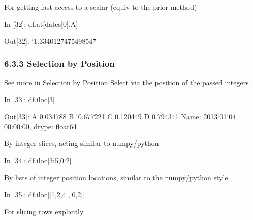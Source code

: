 \documentclass[letterpaper,10pt,english]{sphinxmanual}
\def\PYGZhy{\char`\-}
\def\PYGZsq{\char`\'}
\renewcommand\PYGZsq{\textquotesingle}
\begin{document}
For getting fast access to a scalar (equiv to the prior method)

\begin{OriginalVerbatim}[commandchars=\\\{\}]
\textcolor{nbsphinxin}{In [32]: }df.at[dates[0],\PYGZsq{}A\PYGZsq{}]
\end{OriginalVerbatim}

\begin{OriginalVerbatim}[commandchars=\\\{\}]
\textcolor{nbsphinxout}{Out[32]: }\PYGZhy{}1.3340127475498547
\end{OriginalVerbatim}


\subsubsection{6.3.3 Selection by Position}
\label{pandas_quickstart:6.3.3-Selection-by-Position}
See more in Selection by Position Select via the position of the passed
integers

\begin{OriginalVerbatim}[commandchars=\\\{\}]
\textcolor{nbsphinxin}{In [33]: }df.iloc[3]
\end{OriginalVerbatim}

\begin{OriginalVerbatim}[commandchars=\\\{\}]
\textcolor{nbsphinxout}{Out[33]: }A    0.034788
         B   \PYGZhy{}0.677221
         C    0.120449
         D    0.794341
         Name: 2013\PYGZhy{}01\PYGZhy{}04 00:00:00, dtype: float64
\end{OriginalVerbatim}

By integer slices, acting similar to numpy/python

\begin{OriginalVerbatim}[commandchars=\\\{\}]
\textcolor{nbsphinxin}{In [34]: }df.iloc[3:5,0:2]
\end{OriginalVerbatim}

By lists of integer position locations, similar to the numpy/python
style

\begin{OriginalVerbatim}[commandchars=\\\{\}]
\textcolor{nbsphinxin}{In [35]: }df.iloc[[1,2,4],[0,2]]
\end{OriginalVerbatim}

For slicing rows explicitly
\end{document}
